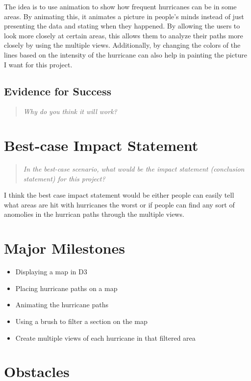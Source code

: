\documentclass{proc}
\begin{document}
The idea is to use animation to show how frequent hurricanes can be in some areas. By animating this, it animates a picture in people's minds instead of just presenting the data and stating when they happened. By allowing the users to look more closely at certain areas, this allows them to analyze their paths more closely by using the multiple views. Additionally, by changing the colors of the lines based on the intensity of the hurricane can also help in painting the picture I want for this project. 

\subsection{Evidence for Success}
\begin{quote}
\textit{Why do you think it will work?} 
\end{quote}



\section{Best-case Impact Statement}
\begin{quote}
\textit{In the best-case scenario, what would be the impact statement (conclusion statement) for this project? \cite{wijk2005value, pike2009science}}
\end{quote}

I think the best case impact statement would be either people can easily tell what areas are hit with hurricanes the worst or if people can find any sort of anomolies in the hurrican paths through the multiple views. 

\section{Major Milestones}

\begin{itemize}
\item Displaying a map in D3
\item Placing hurricane paths on a map
\item Animating the hurricane paths
\item Using a brush to filter a section on the map
\item Create multiple views of each hurricane in that filtered area
\end{itemize}

\section{Obstacles}
\end{document}

